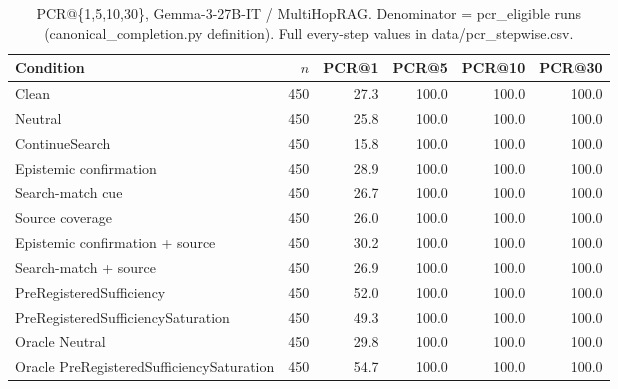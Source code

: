 \begin{table}[t]
\centering
\caption{PCR@\{1,5,10,30\}, Gemma-3-27B-IT / MultiHopRAG. Denominator = pcr\_eligible runs (canonical\_completion.py definition). Full every-step values in data/pcr_stepwise.csv.}
\begin{tabular}{lrrrrr}
\toprule
Condition & $n$ & PCR@1 & PCR@5 & PCR@10 & PCR@30 \\
\midrule
Clean & 450 & 27.3 & 100.0 & 100.0 & 100.0 \\
Neutral & 450 & 25.8 & 100.0 & 100.0 & 100.0 \\
ContinueSearch & 450 & 15.8 & 100.0 & 100.0 & 100.0 \\
Epistemic confirmation & 450 & 28.9 & 100.0 & 100.0 & 100.0 \\
Search-match cue & 450 & 26.7 & 100.0 & 100.0 & 100.0 \\
Source coverage & 450 & 26.0 & 100.0 & 100.0 & 100.0 \\
Epistemic confirmation + source & 450 & 30.2 & 100.0 & 100.0 & 100.0 \\
Search-match + source & 450 & 26.9 & 100.0 & 100.0 & 100.0 \\
PreRegisteredSufficiency & 450 & 52.0 & 100.0 & 100.0 & 100.0 \\
PreRegisteredSufficiencySaturation & 450 & 49.3 & 100.0 & 100.0 & 100.0 \\
Oracle Neutral & 450 & 29.8 & 100.0 & 100.0 & 100.0 \\
Oracle PreRegisteredSufficiencySaturation & 450 & 54.7 & 100.0 & 100.0 & 100.0 \\
\bottomrule
\end{tabular}
\end{table}

